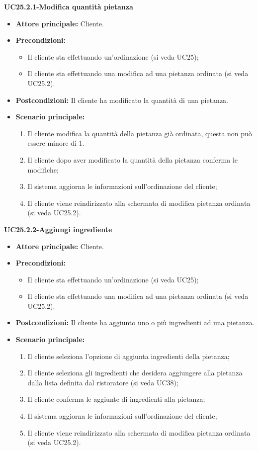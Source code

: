 \textbf{UC25.2.1-Modifica quantità pietanza}
\begin{itemize}
\item \textbf{Attore principale:} Cliente.
\item \textbf{Precondizioni:} 
\begin{itemize}
    \item Il cliente sta effettuando un'ordinazione (si veda UC25);
    \item Il cliente sta effettuando una modifica ad una pietanza ordinata (si veda UC25.2).
\end{itemize}
\item \textbf{Postcondizioni:} Il cliente ha modificato la quantità di una pietanza.
\item \textbf{Scenario principale:}
\begin{enumerate}
    \item Il cliente modifica la quantità della pietanza già ordinata, questa non può essere minore di 1.
    \item Il cliente dopo aver modificato la quantità della pietanza conferma le modifiche;
    \item Il sistema aggiorna le informazioni sull'ordinazione del cliente;
    \item Il cliente viene reindirizzato alla schermata di modifica pietanza ordinata (si veda UC25.2).
\end{enumerate}
\end{itemize}

\textbf{UC25.2.2-Aggiungi ingrediente}
\begin{itemize}
\item \textbf{Attore principale:} Cliente.
\item \textbf{Precondizioni:} 
\begin{itemize}
    \item Il cliente sta effettuando un'ordinazione (si veda UC25);
    \item Il cliente sta effettuando una modifica ad una pietanza ordinata (si veda UC25.2).
\end{itemize}
\item \textbf{Postcondizioni:} Il cliente ha aggiunto uno o più ingredienti ad una pietanza.
\item \textbf{Scenario principale:}
\begin{enumerate}
    \item Il cliente seleziona l'opzione di aggiunta ingredienti della pietanza;
    \item Il cliente seleziona gli ingredienti che desidera aggiungere alla pietanza dalla lista definita dal ristoratore (si veda UC38);
    \item Il cliente conferma le aggiunte di ingredienti alla pietanza;
    \item Il sistema aggiorna le informazioni sull'ordinazione del cliente;
    \item Il cliente viene reindirizzato alla schermata di modifica pietanza ordinata (si veda UC25.2).
\end{enumerate}
\end{itemize}

